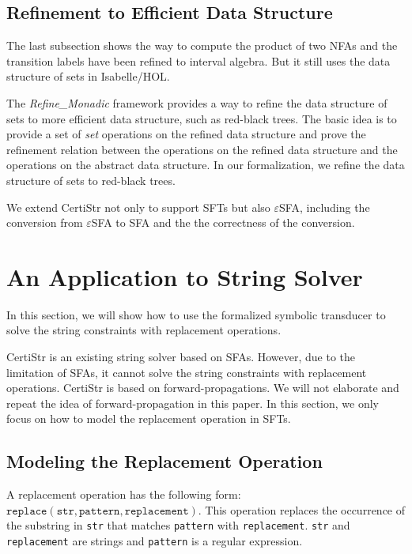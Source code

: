 \documentclass[a4paper,UKenglish,cleveref, autoref, anonymous, thm-restate]{lipics-v2021}
\begin{document}
\subsection{Refinement to Efficient Data Structure}

The last subsection shows the way to compute the product of two NFAs and the transition labels have been refined to interval algebra. But it still uses the data structure of sets in Isabelle/HOL. 

The \emph{Refine\_Monadic} framework provides a way to refine the data structure of sets to more efficient data structure, such as red-black trees. The basic idea is to provide a set of \emph{set} operations on the refined data structure and prove the refinement relation between the operations on the refined data structure and the operations on the abstract data structure.
%
In our formalization, we refine the data structure of sets to red-black trees.

We extend CertiStr \cite{cpp/KanLRS22} not only to support SFTs but also $\varepsilon$SFA, including the conversion from $\varepsilon$SFA to SFA and the the correctness of the conversion. 







\section{An Application to String Solver}
\label{sec-app-str-solver}
In this section, we will show how to use the formalized symbolic transducer to solve the string constraints with replacement operations.

CertiStr is an existing string solver based on SFAs. However, due to the limitation of SFAs, it cannot solve the string constraints with replacement operations. CertiStr is based on forward-propagations. We will not elaborate and repeat the idea of forward-propagation in this paper. In this section, we only focus on how to model the replacement operation in SFTs.


\subsection{Modeling the Replacement Operation}


A replacement operation has the following form: $\texttt{replace}(\texttt{str}, \texttt{pattern}, \texttt{replacement})$. This operation replaces the occurrence of the substring in \texttt{str} that matches \texttt{pattern} with \texttt{replacement}. \texttt{str} and \texttt{replacement} are strings and \texttt{pattern} is a regular expression.
\end{document}

